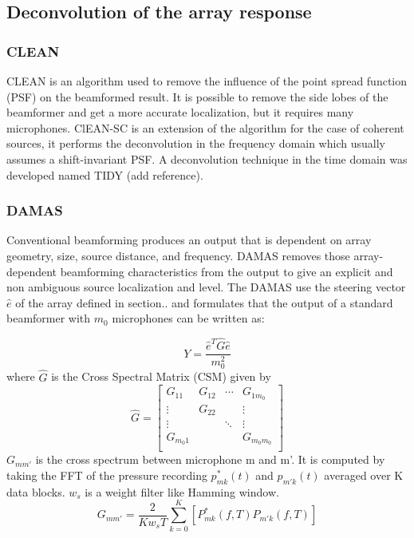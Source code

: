 \subsection{Deconvolution of the array response}

\subsubsection{CLEAN}

CLEAN is an algorithm used to remove the influence of the point spread function (PSF) on the beamformed result. It is possible to remove the side lobes of the beamformer and get a more accurate localization, but it requires many microphones. ClEAN-SC is an extension of the algorithm for the case of coherent sources, it performs the deconvolution in the frequency domain which usually assumes a shift-invariant PSF. A deconvolution technique in the time domain was developed named TIDY (add reference).

\subsubsection{DAMAS}

Conventional beamforming produces an output that is dependent on array geometry, size, source distance, and frequency. DAMAS removes those array-dependent beamforming characteristics from the output to give an explicit and non ambiguous source localization and level. The DAMAS use the steering vector $\hat{e}$ of the array defined in section.. and formulates that the output of a standard beamformer with $m_{0}$ microphones can be written as:

\begin{equation}
    Y=\frac{\hat{e}^{T}\hat{G}\hat{e}}{m_0^2}
    \label{eq:DAMASoutputbeamformer}
\end{equation}
where $\hat{G}$ is the Cross Spectral Matrix (CSM) given by
\begin{equation}
\hat{G}=
    \begin{bmatrix} 
      G_{11} & G_{12} & \cdots & G_{1m_{0}}\\
      \vdots &  G_{22} &       &  \vdots\\
      \vdots &         & \ddots &  \vdots\\
      G_{m_{0}1} &     &       &  G_{m_{0}m_{0}}\\
    \end{bmatrix}  
\end{equation}
$G_{mm'}$ is the cross spectrum between microphone m  and m'. It is computed by taking the FFT of the pressure recording $p^{*}_{mk}(t)$ and $p_{m'k}(t)$ averaged over K data blocks. $w_{s}$ is a weight filter like Hamming window.
\begin{equation}
    G_{mm'}=\frac{2}{Kw_{s}T}\sum\limits_{k=0}^{K}[P^{*}_{mk}(f,T)P_{m'k}(f,T)]
\end{equation}

